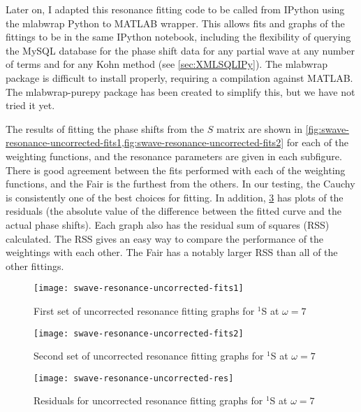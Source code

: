 \documentclass[Dissertation.tex]{subfiles}
\begin{document}
Later on, I adapted this resonance fitting code to be called from IPython 
\cite{ipython} using the mlabwrap \cite{mlabwrap} Python to MATLAB wrapper. 
This allows fits and graphs of the fittings to be in the same IPython 
notebook, including the flexibility of querying the MySQL database for the 
phase shift data for any partial wave at any number of terms and for
any Kohn method
(see \cref{sec:XMLSQLIPy}). The mlabwrap package is difficult to install properly, 
requiring a compilation against MATLAB. The mlabwrap-purepy package
\cite{mlabwrappurepy} has been created to simplify this, but we have not tried it 
yet.

The results of fitting the phase shifts from the $S$ matrix are shown in
\cref{fig:swave-resonance-uncorrected-fits1,fig:swave-resonance-uncorrected-fits2} 
for each of the weighting functions, and the resonance parameters are given 
in each subfigure. There is good agreement between the fits performed with 
each of the weighting functions, and the Fair is the furthest from the 
others. In our testing, the Cauchy is consistently one of the best choices 
for fitting. In addition, \cref{fig:swave-resonance-uncorrected-res} has 
plots of the residuals (the absolute value of the difference between the 
fitted curve and the actual phase shifts). Each graph also has the residual 
sum of squares (RSS) calculated. The RSS gives an easy way to compare the 
performance of the weightings with each other. The Fair has a notably larger 
RSS than all of the other fittings.

\begin{figure}
	\centering
	\texttt{[image: swave-resonance-uncorrected-fits1]}
	\caption{First set of uncorrected resonance fitting graphs for $^1$S at $\omega = 7$}
	\label{fig:swave-resonance-uncorrected-fits1}
\end{figure}

\begin{figure}
	\centering
	\texttt{[image: swave-resonance-uncorrected-fits2]}
	\caption{Second set of uncorrected resonance fitting graphs for $^1$S at $\omega = 7$}
	\label{fig:swave-resonance-uncorrected-fits2}
\end{figure}

\begin{figure}
	\centering
	\texttt{[image: swave-resonance-uncorrected-res]}
	\caption{Residuals for uncorrected resonance fitting graphs for $^1$S at $\omega = 7$}
	\label{fig:swave-resonance-uncorrected-res}
\end{figure}
\end{document}
